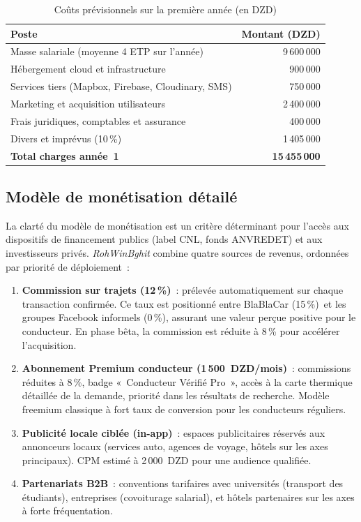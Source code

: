 \begin{table}[H]
\centering
\begin{tabularx}{\textwidth}{|X|r|}
\hline
\rowcolor{rohlight}
\textbf{Poste} & \textbf{Montant (DZD)} \\
\hline
Masse salariale (moyenne 4 ETP sur l'année) & 9\,600\,000 \\
\hline
Hébergement cloud et infrastructure & 900\,000 \\
\hline
Services tiers (Mapbox, Firebase, Cloudinary, SMS) & 750\,000 \\
\hline
Marketing et acquisition utilisateurs & 2\,400\,000 \\
\hline
Frais juridiques, comptables et assurance & 400\,000 \\
\hline
Divers et imprévus (10\,\%) & 1\,405\,000 \\
\hline
\rowcolor{rohlight}
\textbf{Total charges année~1} & \textbf{15\,455\,000} \\
\hline
\end{tabularx}
  \caption{Coûts prévisionnels sur la première année (en DZD)}
\end{table}

\subsection{Modèle de monétisation détailé}

La clarté du modèle de monétisation est un critère déterminant pour l'accès aux dispositifs de financement publics (label CNL, fonds ANVREDET) et aux investisseurs privés. \textit{RohWinBghit} combine quatre sources de revenus, ordonnées par priorité de déploiement~:

\begin{enumerate}
  \item \textbf{Commission sur trajets (12\,\%)}~: prélevée automatiquement sur chaque transaction confirmée. Ce taux est positionné entre BlaBlaCar (15\,\%)\,\cite{blablacar_report_2023} et les groupes Facebook informels (0\,\%), assurant une valeur perçue positive pour le conducteur. En phase bêta, la commission est réduite à 8\,\% pour accélérer l'acquisition.
  \item \textbf{Abonnement Premium conducteur (1\,500~DZD/mois)}~: commissions réduites à 8\,\%, badge «~Conducteur Vérifié Pro~», accès à la carte thermique détaillée de la demande, priorité dans les résultats de recherche. Modèle freemium classique à fort taux de conversion pour les conducteurs réguliers.
  \item \textbf{Publicité locale ciblée (in-app)}~: espaces publicitaires réservés aux annonceurs locaux (services auto, agences de voyage, hôtels sur les axes principaux). CPM estimé à 2\,000~DZD pour une audience qualifiée.
  \item \textbf{Partenariats B2B}~: conventions tarifaires avec universités (transport des étudiants), entreprises (covoiturage salarial), et hôtels partenaires sur les axes à forte fréquentation.
\end{enumerate}

